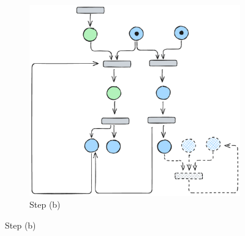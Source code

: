 \begin{figure}[htbp]
\begin{subfigure}[b]{0.45\textwidth}
		\includegraphics[width=\textwidth]{plots/bidirectional_pruning_step_b_forward.pdf}
		\caption{Step (b)}\label{fig:step:b}
	\end{subfigure}\hfill
	
	
	\vspace{1em}
	

\end{figure}
